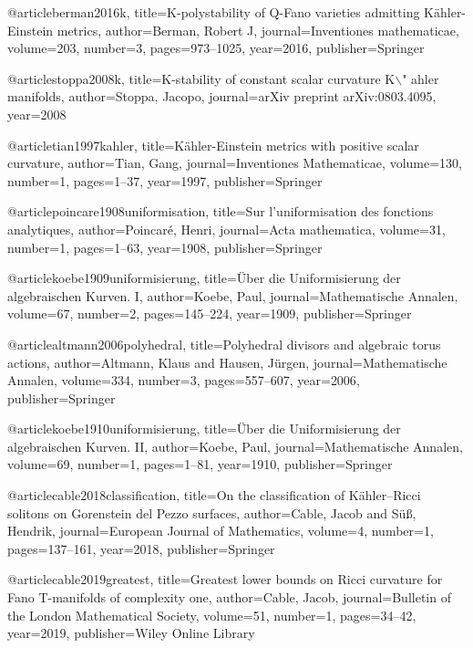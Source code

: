 @article{berman2016k,
  title={K-polystability of Q-Fano varieties admitting K{\"a}hler-Einstein metrics},
  author={Berman, Robert J},
  journal={Inventiones mathematicae},
  volume={203},
  number={3},
  pages={973--1025},
  year={2016},
  publisher={Springer}
}

@article{stoppa2008k,
  title={K-stability of constant scalar curvature K$\backslash$" ahler manifolds},
  author={Stoppa, Jacopo},
  journal={arXiv preprint arXiv:0803.4095},
  year={2008}
}

@article{tian1997kahler,
  title={K{\"a}hler-Einstein metrics with positive scalar curvature},
  author={Tian, Gang},
  journal={Inventiones Mathematicae},
  volume={130},
  number={1},
  pages={1--37},
  year={1997},
  publisher={Springer}
}

@article{poincare1908uniformisation,
  title={Sur l'uniformisation des fonctions analytiques},
  author={Poincar{\'e}, Henri},
  journal={Acta mathematica},
  volume={31},
  number={1},
  pages={1--63},
  year={1908},
  publisher={Springer}
}

@article{koebe1909uniformisierung,
  title={{\"U}ber die Uniformisierung der algebraischen Kurven. I},
  author={Koebe, Paul},
  journal={Mathematische Annalen},
  volume={67},
  number={2},
  pages={145--224},
  year={1909},
  publisher={Springer}
}

@article{altmann2006polyhedral,
  title={Polyhedral divisors and algebraic torus actions},
  author={Altmann, Klaus and Hausen, J{\"u}rgen},
  journal={Mathematische Annalen},
  volume={334},
  number={3},
  pages={557--607},
  year={2006},
  publisher={Springer}
}


@article{koebe1910uniformisierung,
  title={{\"U}ber die Uniformisierung der algebraischen Kurven. II},
  author={Koebe, Paul},
  journal={Mathematische Annalen},
  volume={69},
  number={1},
  pages={1--81},
  year={1910},
  publisher={Springer}
}

@article{cable2018classification,
  title={On the classification of K{\"a}hler--Ricci solitons on Gorenstein del Pezzo surfaces},
  author={Cable, Jacob and S{\"u}{\ss}, Hendrik},
  journal={European Journal of Mathematics},
  volume={4},
  number={1},
  pages={137--161},
  year={2018},
  publisher={Springer}
}

@article{cable2019greatest,
  title={Greatest lower bounds on Ricci curvature for Fano {T}-manifolds of complexity one},
  author={Cable, Jacob},
  journal={Bulletin of the London Mathematical Society},
  volume={51},
  number={1},
  pages={34--42},
  year={2019},
  publisher={Wiley Online Library}
}

